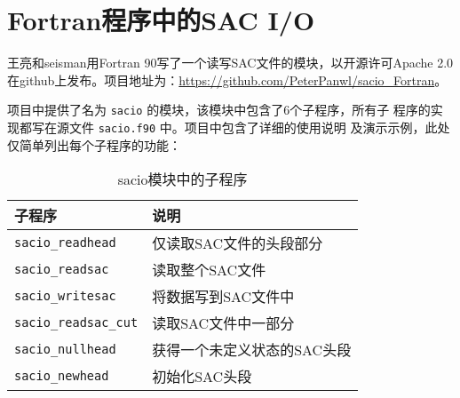 \section{Fortran程序中的SAC I/O}
王亮和seisman用Fortran 90写了一个读写SAC文件的模块，以开源许可Apache 2.0
在github上发布。项目地址为：\url{https://github.com/PeterPanwl/sacio_Fortran}。

项目中提供了名为 \texttt{sacio} 的模块，该模块中包含了6个子程序，所有子
程序的实现都写在源文件 \texttt{sacio.f90} 中。项目中包含了详细的使用说明
及演示示例，此处仅简单列出每个子程序的功能：

\begin{table}[H]
\centering
\caption{sacio模块中的子程序}
\label{table:sacio_Fortran}
\begin{tabular}{ll}
\toprule
子程序      &   说明        \\
\midrule
\verb|sacio_readhead|      &   仅读取SAC文件的头段部分 \\
\verb|sacio_readsac|       &   读取整个SAC文件 \\
\verb|sacio_writesac|      &   将数据写到SAC文件中 \\
\verb|sacio_readsac_cut|   &   读取SAC文件中一部分 \\
\verb|sacio_nullhead|      &   获得一个未定义状态的SAC头段\\
\verb|sacio_newhead|       &   初始化SAC头段\\
\bottomrule
\end{tabular}
\end{table}
